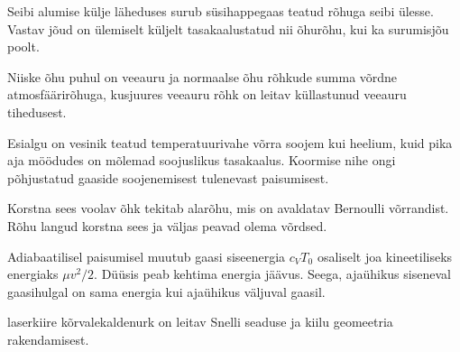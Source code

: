 \documentclass[10pt, twoside]{article}
\begin{document}
{%

\hint
Seibi alumise külje läheduses surub süsihappegaas teatud rõhuga seibi ülesse. Vastav jõud on ülemiselt küljelt tasakaalustatud nii õhurõhu, kui ka surumisjõu poolt.
\probend
\bigskip


\hint
Niiske õhu puhul on veeauru ja normaalse õhu rõhkude summa võrdne atmosfäärirõhuga, kusjuures veeauru rõhk on leitav küllastunud veeauru tihedusest.
\probend
\bigskip


\hint
Esialgu on vesinik teatud temperatuurivahe võrra soojem kui heelium, kuid pika aja möödudes on mõlemad soojuslikus tasakaalus. Koormise nihe ongi põhjustatud gaaside soojenemisest tulenevast paisumisest.
\probend
\bigskip


\hint
Korstna sees voolav õhk tekitab alarõhu, mis on avaldatav Bernoulli võrrandist. Rõhu langud korstna sees ja väljas peavad olema võrdsed.
\probend
\bigskip


\hint
Adiabaatilisel paisumisel muutub gaasi siseenergia $c_VT_0$ osaliselt joa kineetiliseks energiaks $\mu v^2/2$. Düüsis peab kehtima energia jäävus. Seega, ajaühikus siseneval gaasihulgal on sama energia kui ajaühikus väljuval gaasil.
\probend
\bigskip


\hint
laserkiire kõrvalekaldenurk on leitav Snelli seaduse ja kiilu geomeetria rakendamisest.
\probend
\bigskip


}
\end{document}
